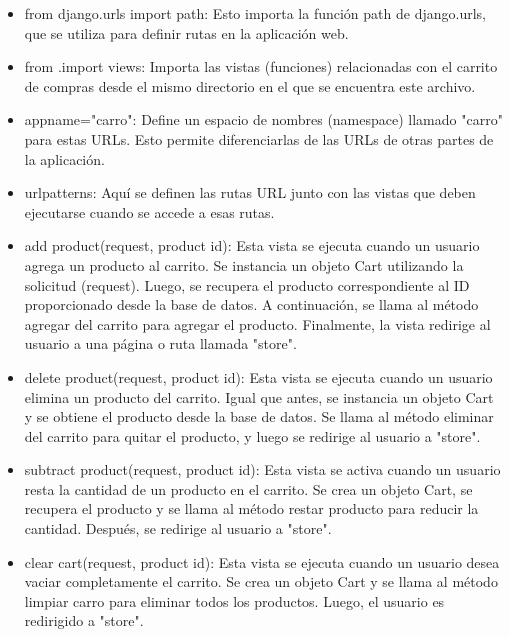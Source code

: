 
\begin{itemize}
        \item from django.urls import path: Esto importa la función path de django.urls, que se utiliza para definir rutas en la aplicación web.
        \item from .import views: Importa las vistas (funciones) relacionadas con el carrito de compras desde el mismo directorio en el que se encuentra este archivo.
        \item appname="carro": Define un espacio de nombres (namespace) llamado "carro" para estas URLs. Esto permite diferenciarlas de las URLs de otras partes de la aplicación.
        \item urlpatterns: Aquí se definen las rutas URL junto con las vistas que deben ejecutarse cuando se accede a esas rutas.
\end{itemize}

\begin{itemize}
        \item add product(request, product id): Esta vista se ejecuta cuando un usuario agrega un producto al carrito. Se instancia un objeto Cart utilizando la solicitud (request). Luego, se recupera el producto correspondiente al ID proporcionado desde la base de datos. A continuación, se llama al método agregar del carrito para agregar el producto. Finalmente, la vista redirige al usuario a una página o ruta llamada "store".
        \item delete product(request, product id): Esta vista se ejecuta cuando un usuario elimina un producto del carrito. Igual que antes, se instancia un objeto Cart y se obtiene el producto desde la base de datos. Se llama al método eliminar del carrito para quitar el producto, y luego se redirige al usuario a "store".
        \item subtract product(request, product id): Esta vista se activa cuando un usuario resta la cantidad de un producto en el carrito. Se crea un objeto Cart, se recupera el producto y se llama al método restar producto para reducir la cantidad. Después, se redirige al usuario a "store".
        \item clear cart(request, product id): Esta vista se ejecuta cuando un usuario desea vaciar completamente el carrito. Se crea un objeto Cart y se llama al método limpiar carro para eliminar todos los productos. Luego, el usuario es redirigido a "store".
\end{itemize}
